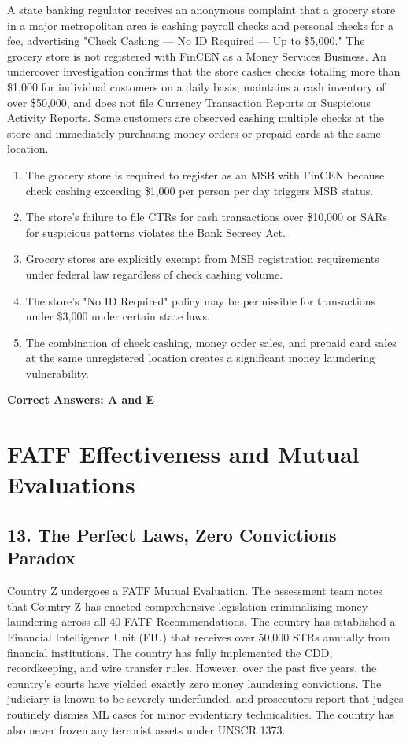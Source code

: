 \documentclass[11pt,a4paper]{article}
\begin{document}
	A state banking regulator receives an anonymous complaint that a grocery store in a major metropolitan area is cashing payroll checks and personal checks for a fee, advertising "Check Cashing — No ID Required — Up to \$5,000." The grocery store is not registered with FinCEN as a Money Services Business. An undercover investigation confirms that the store cashes checks totaling more than \$1,000 for individual customers on a daily basis, maintains a cash inventory of over \$50,000, and does not file Currency Transaction Reports or Suspicious Activity Reports. Some customers are observed cashing multiple checks at the store and immediately purchasing money orders or prepaid cards at the same location.
	
	\begin{enumerate}[label=\Alph*.]
		\item The grocery store is required to register as an MSB with FinCEN because check cashing exceeding \$1,000 per person per day triggers MSB status.
		\item The store's failure to file CTRs for cash transactions over \$10,000 or SARs for suspicious patterns violates the Bank Secrecy Act.
		\item Grocery stores are explicitly exempt from MSB registration requirements under federal law regardless of check cashing volume.
		\item The store's "No ID Required" policy may be permissible for transactions under \$3,000 under certain state laws.
		\item The combination of check cashing, money order sales, and prepaid card sales at the same unregistered location creates a significant money laundering vulnerability.
	\end{enumerate}
	
	\textbf{Correct Answers: A and E}
	
	\section{FATF Effectiveness and Mutual Evaluations}
	
	\subsection{13. The Perfect Laws, Zero Convictions Paradox}
	
	Country Z undergoes a FATF Mutual Evaluation. The assessment team notes that Country Z has enacted comprehensive legislation criminalizing money laundering across all 40 FATF Recommendations. The country has established a Financial Intelligence Unit (FIU) that receives over 50,000 STRs annually from financial institutions. The country has fully implemented the CDD, recordkeeping, and wire transfer rules. However, over the past five years, the country's courts have yielded exactly zero money laundering convictions. The judiciary is known to be severely underfunded, and prosecutors report that judges routinely dismiss ML cases for minor evidentiary technicalities. The country has also never frozen any terrorist assets under UNSCR 1373.
	
\end{document}

